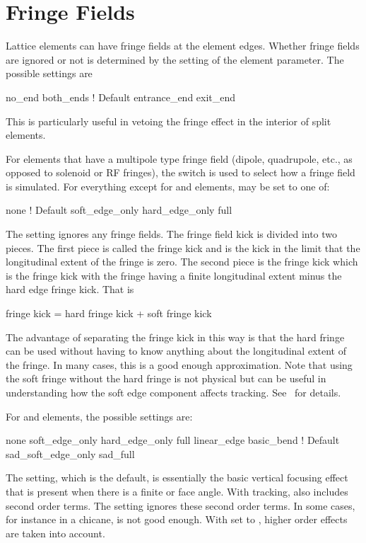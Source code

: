 \section{Fringe Fields}
\label{s:fringe}

Lattice elements can have fringe fields at the element edges. Whether
fringe fields are ignored or not is determined by the setting
of the  element parameter. The possible settings are
\begin{example}
  no_end         
  both_ends             ! Default
  entrance_end
  exit_end
\end{example}
This is particularly useful in vetoing the
fringe effect in the interior of split elements.

For elements that have a multipole type fringe field (dipole,
quadrupole, etc., as opposed to solenoid or RF fringes), the
 switch is used to select how a fringe field is
simulated.  For everything except for  and 
elements,  may be set to one of:
\begin{example}
  none              ! Default 
  soft_edge_only
  hard_edge_only
  full
\end{example}
The  setting ignores any fringe fields.
The fringe field kick is divided into two pieces. 
The first piece is called the  fringe kick and is the kick in the limit
that the longitudinal extent of the fringe is zero. The second piece is the 
 fringe kick which is the fringe kick with the fringe having a finite
longitudinal extent minus the hard edge fringe kick. That is
\begin{example}
  fringe kick = hard fringe kick + soft fringe kick
\end{example}
The advantage of separating the fringe kick in this way is that the hard fringe can
be used without having to know anything about the longitudinal extent of the fringe.
In many cases, this is a good enough approximation. Note that using the soft fringe
without the hard fringe is not physical but can be useful in understanding how
the soft edge component affects tracking.
See~ for details.

For  and  elements, the possible 
settings are:
\begin{example}
  none
  soft_edge_only
  hard_edge_only
  full
  linear_edge
  basic_bend        ! Default 
  sad_soft_edge_only
  sad_full
\end{example}
The  setting, which is the default, is essentially the
basic vertical focusing effect that is present when there is a finite
 or  face angle. With  tracking,
 also includes second order terms.  The
 setting ignores these second order terms.  In some
cases, for instance in a chicane,  is not good
enough. With  set to , higher order effects
are taken into account.

